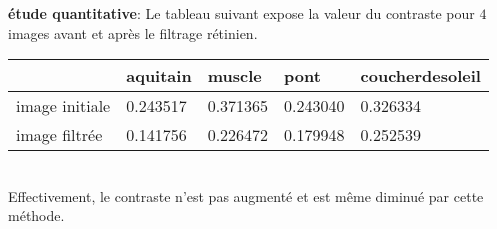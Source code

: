 \documentclass[12pt]{article}
\numberwithin{equation}{section}
\begin{document}
\textbf{étude quantitative}: Le tableau suivant expose la valeur du contraste pour $4$ images avant et après le filtrage rétinien.\\
\begin{tabular}{|l|l|l|l|l|}
\hline
 & aquitain & muscle & pont & coucherdesoleil\\
\hline
image initiale & 0.243517 & 0.371365 & 0.243040 & 0.326334\\
\hline
image filtrée & 0.141756 & 0.226472 & 0.179948 & 0.252539 \\
\hline
\end{tabular}\\

Effectivement, le contraste n'est pas augmenté et est même diminué par cette méthode.
\end{document}
